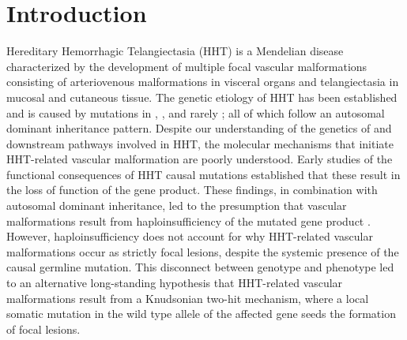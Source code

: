 \section{Introduction}
Hereditary Hemorrhagic Telangiectasia (HHT) is a Mendelian disease characterized by the development of multiple focal vascular malformations consisting of arteriovenous malformations in visceral organs and telangiectasia in mucosal and cutaneous tissue. The genetic etiology of HHT has been established and is caused by mutations in  \citep{mcallister1994},  \citep{johnson1996}, and rarely  \citep{gallione2004}; all of which follow an autosomal dominant inheritance pattern. Despite our understanding of the genetics of and downstream pathways involved in HHT, the molecular mechanisms that initiate HHT-related vascular malformation are poorly understood. Early studies of the functional consequences of HHT causal mutations established that these result in the loss of function of the gene product. These findings, in combination with autosomal dominant inheritance, led to the presumption that vascular malformations result from haploinsufficiency of the mutated gene product \citep{pece1997, abdalla2000, ola2018}. However, haploinsufficiency does not account for why HHT-related vascular malformations occur as strictly focal lesions, despite the systemic presence of the causal germline mutation. This disconnect between genotype and phenotype led to an alternative long-standing hypothesis that HHT-related vascular malformations result from a Knudsonian two-hit mechanism, where a local somatic mutation in the wild type allele of the affected gene seeds the formation of focal lesions.

